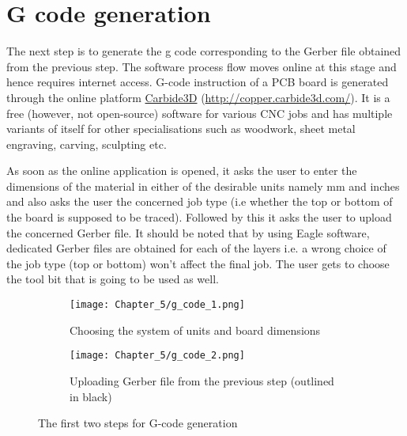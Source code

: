 \section{G code generation} \label{gcodegen}

The next step is to generate the g code corresponding to the Gerber file obtained from the previous step. The software process flow moves online at this stage and hence requires internet access. G-code instruction of a PCB board is generated through the online platform \href{http://copper.carbide3d.com/}{Carbide3D} (\url{http://copper.carbide3d.com/}). It is a free (however, not open-source) software for various CNC jobs and has multiple variants of itself for other specialisations such as woodwork, sheet metal engraving, carving, sculpting etc. \par

As soon as the online application is opened, it asks the user to enter the dimensions of the material in either of the desirable units namely mm and inches and also asks the user the concerned job type (i.e whether the top or bottom of the board is supposed to be traced). Followed by this it asks the user to upload the concerned Gerber file. It should be noted that by using Eagle software, dedicated Gerber files are obtained for each of the layers i.e. a wrong choice of the job type (top or bottom) won’t affect the final job. The user gets to choose the tool bit that is going to be used as well. \par

\begin{figure}[h]
 \begin{subfigure}{0.5\textwidth}
  \texttt{[image: Chapter\_5/g\_code\_1.png]}
  \caption{Choosing the system of units and board dimensions}
  \label{fig:g1}
 \end{subfigure}
 \begin{subfigure}{0.5\textwidth}
  \texttt{[image: Chapter\_5/g\_code\_2.png]}
  \caption{Uploading Gerber file from the previous step (outlined in black)}
  \label{fig:g2}
 \end{subfigure}
 \caption{The first two steps for G-code generation}
 \label{fig:g12}
\end{figure}

